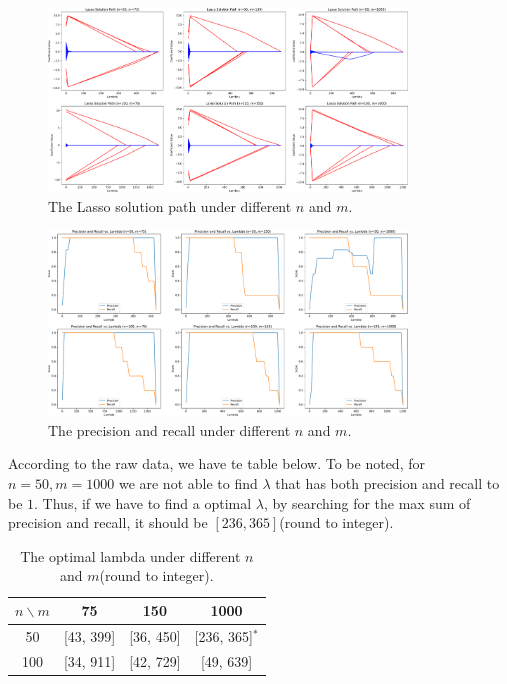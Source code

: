 \documentclass{article}
\begin{document}
\subsection{}
\begin{figure}[htbp]
    \begin{center}
        \includegraphics[width=0.85\textwidth]{./figures/lasso_solution_path_n_d_variation.pdf}
    \end{center}
    \caption{The Lasso solution path under different $ n $ and $ m $.}\label{fig:}
\end{figure}
\begin{figure}[htbp]
    \begin{center}
        \includegraphics[width=0.85\textwidth]{./figures/eval_precision_recall_vs_lambda.pdf}
    \end{center}
    \caption{The precision and recall under different $ n $ and $ m $.}\label{fig:}
\end{figure}
According to the raw data, we have te table below. To be noted, for $ n=50, m = 1000 $ we are not able to find $ \lambda $ that has both precision and recall to be $ 1 $. Thus, if we have to find a optimal $ \lambda $, by searching for the max sum of precision and recall, it should be $ [236, 365] $(round to integer).
\begin{table}[htbp]
\centering
\caption{The optimal lambda under different $ n $ and $ m $(round to integer).}
\label{tab:optimal_lambda}
\begin{tabular}{c|c|c|c}
\hline
\(n \backslash m\) & 75 & 150 & 1000 \\
\hline
50  & [43, 399] & [36, 450] & [236, 365]$^*$ \\
100 & [34, 911] & [42, 729] & [49, 639] \\
\hline
\end{tabular}
\end{table}
\clearpage
\end{document}

